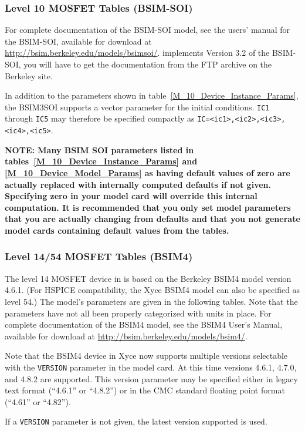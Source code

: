 \clearpage
\subsubsection{Level 10 MOSFET Tables (BSIM-SOI)}
For complete documentation of the BSIM-SOI model, see the users' manual
for the BSIM-SOI, available for download at
\url{http://bsim.berkeley.edu/models/bsimsoi/}.
\Xyce{} implements Version 3.2 of the BSIM-SOI, you will have to get the
documentation from the FTP archive on the Berkeley site.

In addition to the parameters shown in table~\ref{M_10_Device_Instance_Params}, 
the BSIM3SOI supports a vector parameter for the initial conditions.    \texttt{IC1} through \texttt{IC5}
may therefore be specified compactly as \texttt{IC=<ic1>,<ic2>,<ic3>, <ic4>,<ic5>}.

\textbf{NOTE:  Many BSIM SOI parameters listed in
tables~\ref{M_10_Device_Instance_Params} and \ref{M_10_Device_Model_Params} as
having default values of zero are actually replaced with internally computed
defaults if not given.  Specifying zero in your model card will override this
internal computation.  It is recommended that you only set model parameters
that you are actually changing from defaults and that you not generate model
cards containing default values from the tables.}



\clearpage
\subsubsection{Level 14/54 MOSFET Tables (BSIM4)}
The level 14 MOSFET device in \Xyce{} is based on the Berkeley BSIM4 model
version 4.6.1.  (For HSPICE compatibility, the Xyce BSIM4 model can also be
specified as level 54.)  The model's parameters are given in the following
tables.  Note that the parameters have not all been properly categorized with
units in place.  For complete documentation of the BSIM4 model, see the BSIM4
User’s Manual, available for download at
\url{http://bsim.berkeley.edu/models/bsim4/}.

Note that the BSIM4 device in Xyce now supports multiple versions
selectable with the \texttt{VERSION} parameter in the model card.  At
this time versions 4.6.1, 4.7.0, and 4.8.2 are supported.  This
version parameter may be specified either in legacy text format
(``4.6.1'' or ``4.8.2'') or in the CMC standard floating point format
(``4.61'' or ``4.82'').

If a \texttt{VERSION} parameter is not given, the latest version
supported is used.

